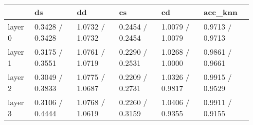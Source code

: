 \begin{tabular}{llllll}
\toprule
{} &               ds &               dd &               cs &               cd &          acc\_knn \\
\midrule
layer 0 &  0.3428 / 0.3428 &  1.0732 / 1.0732 &  0.2454 / 0.2454 &  1.0079 / 1.0079 &  0.9713 / 0.9713 \\
layer 1 &  0.3175 / 0.3551 &  1.0761 / 1.0719 &  0.2290 / 0.2531 &  1.0268 / 1.0000 &  0.9861 / 0.9661 \\
layer 2 &  0.3049 / 0.3833 &  1.0775 / 1.0687 &  0.2209 / 0.2731 &  1.0326 / 0.9817 &  0.9915 / 0.9529 \\
layer 3 &  0.3106 / 0.4444 &  1.0768 / 1.0619 &  0.2260 / 0.3159 &  1.0406 / 0.9355 &  0.9911 / 0.9155 \\
\bottomrule
\end{tabular}
